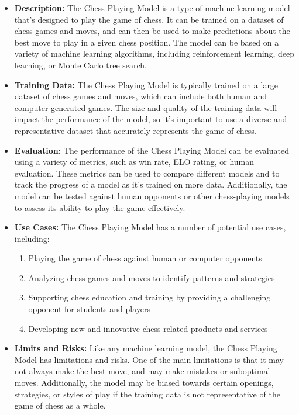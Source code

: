 \begin{itemize}
    \item \textbf{Description:} The Chess Playing Model is a type of machine learning model that's designed to play the game of chess. It can be trained on a dataset of chess games and moves, and can then be used to make predictions about the best move to play in a given chess position. The model can be based on a variety of machine learning algorithms, including reinforcement learning, deep learning, or Monte Carlo tree search.
    \item \textbf{Training Data:} The Chess Playing Model is typically trained on a large dataset of chess games and moves, which can include both human and computer-generated games. The size and quality of the training data will impact the performance of the model, so it's important to use a diverse and representative dataset that accurately represents the game of chess.
    \item \textbf{Evaluation:} The performance of the Chess Playing Model can be evaluated using a variety of metrics, such as win rate, ELO rating, or human evaluation. These metrics can be used to compare different models and to track the progress of a model as it's trained on more data. Additionally, the model can be tested against human opponents or other chess-playing models to assess its ability to play the game effectively.
    \item \textbf{Use Cases:} The Chess Playing Model has a number of potential use cases, including:
        \begin{enumerate}  
            \item Playing the game of chess against human or computer opponents
            \item Analyzing chess games and moves to identify patterns and strategies
            \item Supporting chess education and training by providing a challenging opponent for students and players
            \item Developing new and innovative chess-related products and services
        \end{enumerate}
    \item \textbf{Limits and Risks:} Like any machine learning model, the Chess Playing Model has limitations and risks. One of the main limitations is that it may not always make the best move, and may make mistakes or suboptimal moves. Additionally, the model may be biased towards certain openings, strategies, or styles of play if the training data is not representative of the game of chess as a whole.

\end{itemize}
